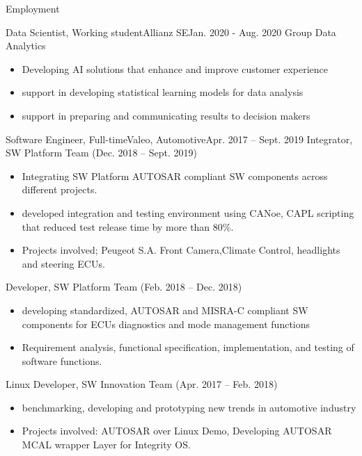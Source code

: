 \documentclass[]{mcdowellcv}
\begin{document}
	\begin{cvsection}{Employment}
		\begin{cvsubsection}{Data Scientist, Working student}{Allianz SE}{Jan. 2020 -  Aug. 2020}
			Group Data Analytics			
			\begin{itemize}
				\item Developing AI solutions that enhance and improve customer experience
				\item support in developing statistical learning models for data analysis
				\item support in preparing and communicating results to decision makers
			\end{itemize}
		\end{cvsubsection}
		
		\begin{cvsubsection}{Software Engineer, Full-time}{Valeo, Automotive}{Apr. 2017 -- Sept. 2019}	
			Integrator, SW Platform Team (Dec. 2018 -- Sept. 2019)
			\begin{itemize}
				\item Integrating SW Platform AUTOSAR compliant SW components across different projects.
				\item developed integration and testing environment using CANoe, CAPL scripting that reduced test release time by more than 80\%.
				\item Projects involved; Peugeot S.A. Front Camera,Climate Control, headlights and steering ECUs.
			\end{itemize}
			Developer, SW Platform Team (Feb. 2018 -- Dec. 2018)
			\begin{itemize}
				\item developing standardized, AUTOSAR and MISRA-C compliant SW components for ECUs diagnostics and mode management functions
				\item Requirement analysis, functional specification, implementation, and testing of software functions.
			\end{itemize}
			Linux Developer, SW Innovation Team (Apr. 2017 -- Feb. 2018)
			\begin{itemize}
				\item benchmarking, developing and prototyping new trends in automotive industry 
				\item Projects involved: AUTOSAR over Linux Demo, Developing AUTOSAR MCAL wrapper Layer for Integrity OS.
			\end{itemize}
			
		\end{cvsubsection}
		

\end{cvsection}
\end{document}
